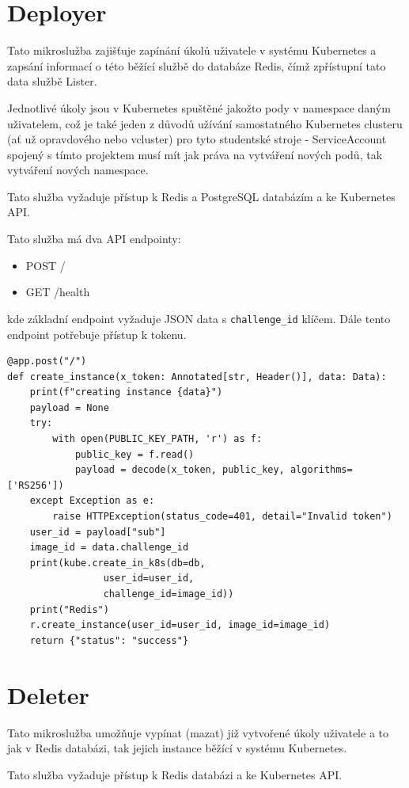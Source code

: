 \documentclass[12pt, a4paper,
oneside,      %
openright
]{report}
\begin{document}
\section{Deployer}
Tato mikroslužba zajišťuje zapínání úkolů uživatele v systému Kubernetes a zapsání informací o této běžící službě do databáze Redis, čímž zpřístupní tato data službě Lister.

Jednotlivé úkoly jsou v Kubernetes spuštěné jakožto pody v namespace daným uživatelem, což je také jeden z důvodů užívání samostatného Kubernetes clusteru (ať už opravdového nebo vcluster) pro tyto studentské stroje - ServiceAccount  spojený s tímto projektem musí mít jak práva na vytváření nových podů, tak vytváření nových namespace.

Tato služba vyžaduje přístup k Redis a PostgreSQL databázím a ke Kubernetes API.

Tato služba má dva API endpointy:
\begin{itemize}
	\item POST /
	\item GET /health
\end{itemize}
kde základní endpoint vyžaduje JSON data s \texttt{challenge\_id} klíčem. Dále tento endpoint potřebuje přístup k tokenu.

\begin{lstlisting}[style=Python, caption=Ukázka kódu pro vytvoření instance]
@app.post("/")
def create_instance(x_token: Annotated[str, Header()], data: Data):
    print(f"creating instance {data}")
    payload = None
    try:
        with open(PUBLIC_KEY_PATH, 'r') as f:
            public_key = f.read()
            payload = decode(x_token, public_key, algorithms=['RS256'])
    except Exception as e:
        raise HTTPException(status_code=401, detail="Invalid token")
    user_id = payload["sub"]
    image_id = data.challenge_id
    print(kube.create_in_k8s(db=db, 
			     user_id=user_id, 
			     challenge_id=image_id))
    print("Redis")
    r.create_instance(user_id=user_id, image_id=image_id)
    return {"status": "success"}
\end{lstlisting}

\section{Deleter}
Tato mikroslužba umožňuje vypínat (mazat) již vytvořené úkoly uživatele a to jak v Redis databázi, tak jejich instance běžící v systému Kubernetes.

Tato služba vyžaduje přístup k Redis databázi a ke Kubernetes API.
\end{document}
